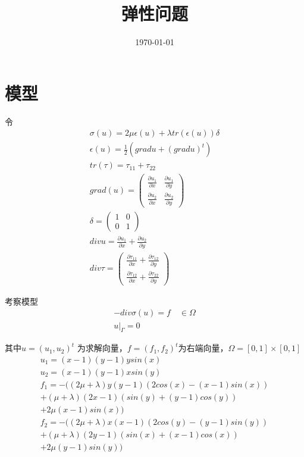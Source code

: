 \documentclass[UTF8,titlepage,twocolumn]{ctexart}
\title{弹性问题}
\date{\today}
\begin{document}
\maketitle

\section{模型}

令
$$
\begin{matrix}
	\sigma(u) = 2 \mu \epsilon(u) + \lambda tr(\epsilon(u)) \delta \\
	\epsilon(u) = \frac{1}{2} (grad u + (grad u)^t) \\
	tr(\tau) = \tau_{11} + \tau_{22} \\
	grad(u) = \begin{pmatrix}
		\frac{\partial u_1}{\partial x} & \frac{\partial u_1}{\partial y} \\
		\frac{\partial u_2}{\partial x} &
		\frac{\partial u_2}{\partial y}
	\end{pmatrix} \\
	\delta = \begin{pmatrix}
		1 & 0 \\
		0 & 1
	\end{pmatrix} \\
	div u = \frac{\partial u_1}{\partial x} + \frac{\partial u_2}{\partial y} \\
	div \tau = \begin{pmatrix}
		\frac{\partial \tau_{11}}{\partial x} + \frac{\partial \tau_{12}}{\partial y} \\
		\frac{\partial \tau_{12}}{\partial x} + \frac{\partial \tau_{22}}{\partial 
		y}
	\end{pmatrix}
\end{matrix}
$$

考察模型
$$
\begin{matrix}
	-div \sigma(u) = f \quad \in \Omega  \\
	u |_{\Gamma} = 0
\end{matrix}
$$ 
\par
其中$ u = (u_1,u_2)^t $ 为求解向量，$ f = (f_1,f_2)^t $为右端向量，$ \Omega = [0,1] \times [0,1] $
$$
\begin{matrix}
	u_1 = (x - 1)(y - 1) y sin(x) 
	\\
	u_2 = (x - 1)(y - 1) x sin(y) 
	\\
	f_1 = -((2 \mu + \lambda) y (y - 1) (2 cos(x) - (x - 1) sin(x)) \\
	+ (\mu + \lambda) (2 x - 1) (sin(y) + (y - 1) cos(y)) \\
	+ 2 \mu (x - 1) sin(x)) 
	\\
	f_2 = -((2 \mu + \lambda) x (x - 1) (2 cos(y) - (y - 1) sin(y)) \\
	+ (\mu + \lambda) (2 y - 1) (sin(x) + (x - 1) cos(x)) \\ 
	+ 2 \mu (y - 1) sin(y))
\end{matrix}
$$
\end{document}
